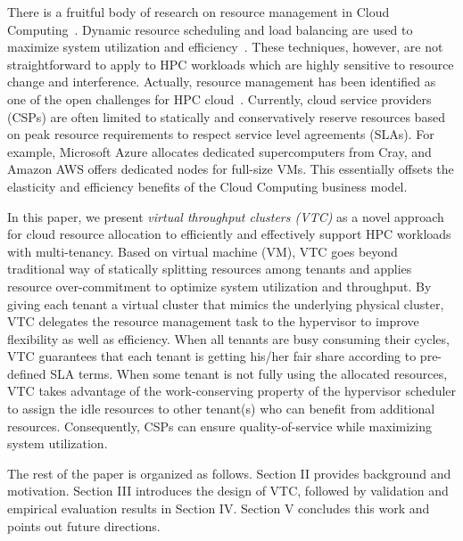 There is a fruitful body of research on resource management in 
Cloud Computing~\cite{singh2016survey,zhan2015cloud,gill2018chopper}. Dynamic resource scheduling and 
load balancing are used 
to maximize system utilization and efficiency~\cite{adhikari2018heuristic,panwar2015load}. These techniques, however, 
are not straightforward to apply to HPC workloads which are highly sensitive to resource change and interference. 
Actually, resource management has been identified as one of the open 
challenges for HPC cloud~\cite{netto2018hpc}. 
Currently, cloud service providers (CSPs) are often limited to statically and conservatively reserve 
resources based on peak resource requirements to respect service level agreements (SLAs). For example, Microsoft Azure 
allocates dedicated supercomputers from Cray, and Amazon AWS offers dedicated nodes for full-size VMs. 
This essentially offsets 
the elasticity and efficiency benefits of the Cloud Computing business model. 

In this paper, we present \textit{virtual throughput clusters (VTC)} as a novel approach for cloud 
resource allocation to efficiently and effectively support 
HPC workloads with multi-tenancy. Based on virtual machine (VM), VTC goes beyond traditional way of 
statically splitting resources among tenants and applies resource over-commitment to optimize 
system utilization and throughput. By giving each tenant a virtual cluster that mimics the 
underlying physical cluster, VTC delegates the resource management task 
to the hypervisor to improve flexibility as well as efficiency. When all tenants are busy consuming their cycles, 
VTC guarantees that each tenant is getting his/her fair share according to pre-defined SLA terms. When 
some tenant is not fully using the allocated resources, VTC takes advantage of the work-conserving 
property of the hypervisor scheduler to assign the idle resources to other tenant(s) who can benefit 
from additional resources. Consequently, CSPs can ensure quality-of-service while maximizing 
system utilization. 

The rest of the paper is organized as follows. 
Section II provides background and motivation. Section III introduces the design of VTC, followed by validation 
and empirical evaluation results in Section IV. Section V concludes this work and points out future directions.